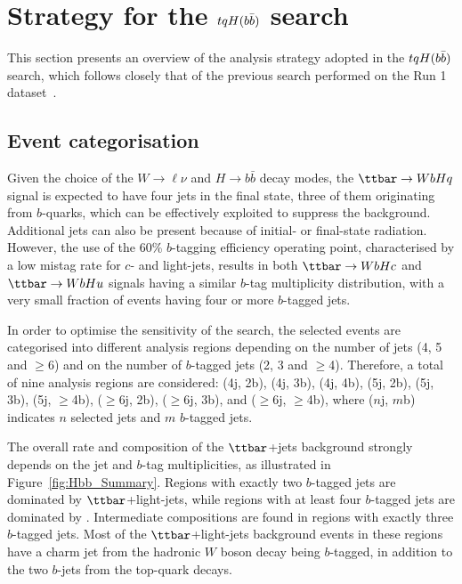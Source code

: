 
\section{Strategy for the $tqH(b\bar{b})$ search}
\label{sec:strategy_Hbb}

This section presents an overview of the analysis strategy adopted in the $tqH(b\bar{b})$ search, which
follows closely that of the previous search performed on the Run 1 dataset~\cite{Aad:2015pja}.

\subsection{Event categorisation}
\label{sec:event_categorisation}

Given the choice of the $W\to\ell\nu$ and $H\to b\bar{b}$ decay modes, the $\ttbar \to WbHq$ signal 
is expected to have four jets in the final state, three of them originating from $b$-quarks, which 
can be effectively exploited to suppress the background. 
Additional jets can also be present because of initial- or final-state radiation.
However, the use of the 60\% $b$-tagging efficiency operating point, characterised by a low mistag rate for
$c$- and light-jets, results in both $\Hc$ and $\Hu$ signals having a similar $b$-tag multiplicity distribution,
with a very small fraction of events having four or more $b$-tagged jets.

In order to optimise the sensitivity of the search, the selected events are categorised into different analysis 
regions depending on the number of jets (4, 5 and $\geq$6) and on the number of $b$-tagged jets (2, 3 and $\geq$4).
Therefore, a total of nine analysis regions are considered:
(4j, 2b), (4j, 3b), (4j, 4b), (5j, 2b), (5j, 3b), (5j, $\geq$4b), ($\geq$6j, 2b), ($\geq$6j, 3b), and ($\geq$6j, $\geq$4b), 
where ($n$j, $m$b) indicates $n$ selected jets and $m$ $b$-tagged jets. 

The overall rate and composition of the $\ttbar$+jets background strongly depends on the jet and $b$-tag 
multiplicities, as illustrated in Figure~\ref{fig:Hbb_Summary}.
Regions with exactly two $b$-tagged jets are dominated by $\ttbar$+light-jets, while regions with 
at least four $b$-tagged jets are dominated by \ttbin. Intermediate compositions are found in regions with exactly three 
$b$-tagged jets.  Most of the $\ttbar$+light-jets background events in these regions have a charm jet from the hadronic $W$ boson 
decay  being $b$-tagged, in addition to the two $b$-jets from the top-quark decays.

